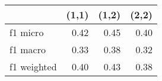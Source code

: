 \begin{tabular}{lrrr}
\toprule
{} &  (1,1) &  (1,2) &  (2,2) \\
\midrule
f1 micro    &   0.42 &   0.45 &   0.40 \\
f1 macro    &   0.33 &   0.38 &   0.32 \\
f1 weighted &   0.40 &   0.43 &   0.38 \\
\bottomrule
\end{tabular}
